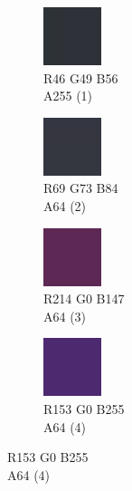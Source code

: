 \vspace*{-0.125cm}
\begin{figure}[!h]\label{gui-colors}\centering
	\captionsetup{justification=centering}
	\begin{subfigure}{0.105\textwidth}\centering
		\includegraphics[frame]{gui-imgs/R46G49B56A255}
		\vspace*{-20px}\caption*{\hspace*{-0.25px}\tiny R46 G49 B56 \\ \tiny A255 (1)}
	\end{subfigure}
	\begin{subfigure}{0.105\textwidth}\centering
		\includegraphics[frame]{gui-imgs/R69G73B84A64}
		\vspace*{-20px}\caption*{\hspace*{-0.25px}\tiny R69 G73 B84 \\ \tiny A64 (2)}
	\end{subfigure}
	\begin{subfigure}{0.105\textwidth}\centering
		\includegraphics[frame]{gui-imgs/R214G0B147A64}
		\vspace*{-20px}\caption*{\hspace*{-0.25px}\tiny R214 G0 B147 \\ \tiny A64 (3)}
	\end{subfigure}
		\begin{subfigure}{0.105\textwidth}\centering
		\includegraphics[frame]{gui-imgs/R153G0B255A64}
		\vspace*{-20px} \caption*{\hspace*{-0.25px}\tiny R153 G0 B255 \\ \tiny A64 (4)}

\end{subfigure}
\end{figure}
